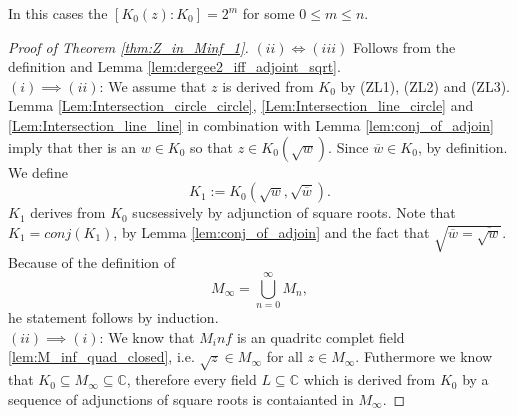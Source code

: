 \begin{remark}
    \label{rem:Z_in_Minf_1}
    In this cases the $[K_0(z):K_0] = 2^m$ for some $0 \le m \le n$.
\end{remark}
\begin{proof}[Proof of Theorem \ref{thm:Z_in_Minf_1}]
    $(ii) \iff (iii)$ Follows from the definition and Lemma \ref{lem:dergee2_iff_adjoint_sqrt}.\\
    $(i) \implies (ii)$: We assume that $z$ is derived from $K_0$ by (ZL1), (ZL2) and (ZL3). %
    Lemma \ref{Lem:Intersection_circle_circle}, \ref{Lem:Intersection_line_circle} and \ref{Lem:Intersection_line_line} in combination with Lemma \ref{lem:conj_of_adjoin} 
    imply that ther is an $w \in K_0$ so that $z \in K_0(\sqrt{w})$. Since $\overline{w} \in K_0$, by definition. We define
    $$K_1 := K_0(\sqrt{w},\sqrt{\overline{w}}).$$
    $K_1$ derives from $K_0$ sucsessively by adjunction of square roots. Note that $K_1 = conj(K_1)$, by Lemma \ref{lem:conj_of_adjoin} and the fact that $\sqrt{\overline{w} = \overline{\sqrt{w}}}$.
    Because of the definition of $$M_{\infty} = \bigcup_{n=0}^{\infty} M_n,$$
    he statement follows by induction.\\ %
    $(ii) \implies (i)$: We know that $M_inf$ is an quadritc complet field \ref{lem:M_inf_quad_closed}, i.e. $\sqrt{z} \in M_{\infty}$ for all $z \in M_{\infty}$.
    Futhermore we know that $K_0\subseteq M_{\infty} \subseteq \mathbb{C}$, %
    therefore every field $L\subseteq \mathbb{C}$ which is derived from $K_0$ by a sequence of adjunctions of square roots is contaianted in $M_{\infty}$.
\end{proof}